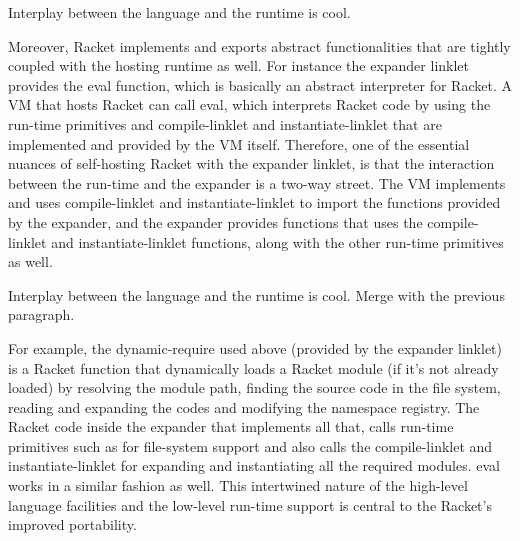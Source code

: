 	\begin{paragraph-here}
		Interplay between the language and the runtime is cool.


		Moreover, Racket implements and exports abstract functionalities that are tightly coupled with the hosting runtime as well. For instance the expander linklet provides the eval function, which is basically an abstract interpreter for Racket. A VM that hosts Racket can call eval, which interprets Racket code by using the run-time primitives and compile-linklet and instantiate-linklet that are implemented and provided by the VM itself. Therefore, one of the essential nuances of self-hosting Racket with the expander linklet, is that the interaction between the run-time and the expander is a two-way street. The VM implements and uses compile-linklet and instantiate-linklet to import the functions provided by the expander, and the expander provides functions that uses the compile-linklet and instantiate-linklet functions, along with the other run-time primitives as well.
	\end{paragraph-here}

	\begin{paragraph-here}
		Interplay between the language and the runtime is cool. Merge with the previous paragraph.

		For example, the dynamic-require used above (provided by the expander linklet) is a Racket function that dynamically loads a Racket module (if it’s not already loaded) by resolving the module path, finding the source code in the file system, reading and expanding the codes and modifying the namespace registry. The Racket code inside the expander that implements all that, calls run-time primitives such as for file-system support and also calls the compile-linklet and instantiate-linklet for expanding and instantiating all the required modules. eval works in a similar fashion as well. This intertwined nature of the high-level language facilities and the low-level run-time support is central to the Racket’s improved portability.
	\end{paragraph-here}



